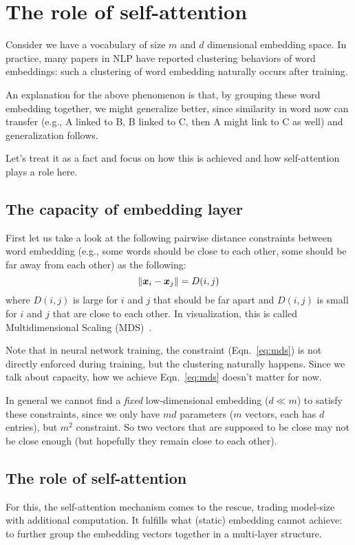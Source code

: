 \section{The role of self-attention}
Consider we have a vocabulary of size $m$ and $d$ dimensional embedding space. In practice, many papers in NLP have reported clustering behaviors of word embeddings: such a clustering of word embedding naturally occurs after training.  

An explanation for the above phenomenon is that, by grouping these word embedding together, we might generalize better, since similarity in word now can transfer (e.g., A linked to B, B linked to C, then A might link to C as well) and generalization follows. 

Let's treat it as a fact and focus on how this is achieved and how self-attention plays a role here.  

\subsection{The capacity of embedding layer}
First let us take a look at the following pairwise distance constraints between word embedding (e.g., some words should be close to each other, some should be far away from each other) as the following:
\begin{equation}
    \|{\bm{x}}_i - {\bm{x}}_j\| = D(i, j) \label{eq:mds}
\end{equation}
where $D(i,j)$ is large for $i$ and $j$ that should be far apart and $D(i,j)$ is small for $i$ and $j$ that are close to each other. In visualization, this is called Multidimensional Scaling (MDS)~\cite{cox2008multidimensional}. 

Note that in neural network training, the constraint (Eqn.~\ref{eq:mds}) is not directly enforced during training, but the clustering naturally happens. Since we talk about capacity, how we achieve Eqn.~\ref{eq:mds} doesn't matter for now. 

In general we cannot find a \emph{fixed} low-dimensional embedding ($d \ll m$) to satisfy these constraints, since we only have $md$ parameters ($m$ vectors, each has $d$ entries), but $m^2$ constraint. So two vectors that are supposed to be close may not be close enough (but hopefully they remain close to each other). 

\subsection{The role of self-attention}
For this, the self-attention mechanism comes to the rescue, trading model-size with additional computation. It fulfills what (static) embedding cannot achieve: to further group the embedding vectors together in a multi-layer structure.

